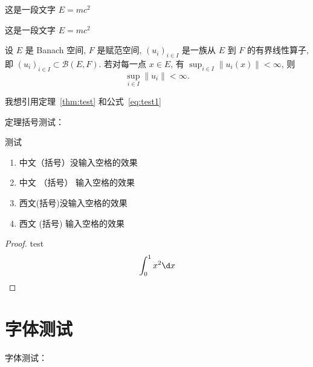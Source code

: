 \begin{lemm}
    这是一段文字 $E = m c^2$
\end{lemm}

\begin{rema}
    这是一段文字 $E = m c^2$
\end{rema}

\begin{theo}\label{thm:test}
    设 $E$ 是 Banach 空间, $F$ 是赋范空间, $(u_i)_{i\in I}$ 是一族从 $E$ 到 $F$ 的有界线性算子,
    即 $(u_i)_{i\in I}\subset \mathcal{B}(E,F)$. 若对每一点 $x\in E$, 有
    $\sup_{i\in I} \|u_i(x)\|<\infty$, 则
    \begin{equation}\label{eq:test1}
        \sup_{i\in I} \|u_i\| < \infty.
    \end{equation}
\end{theo}

我想引用定理~\ref{thm:test} 和公式~\ref{eq:test1}

定理括号测试：

\begin{theo}
    测试
    \begin{enumerate}
        \item 中文（括号）没输入空格的效果
        \item 中文 （括号） 输入空格的效果
        \item 西文(括号)没输入空格的效果
        \item 西文 (括号) 输入空格的效果
    \end{enumerate}
\end{theo}

\begin{proof}
    test
    \[
        \int_{0}^{1} x^2 \d x
    \]
\end{proof}


\section{字体测试}
字体测试：

